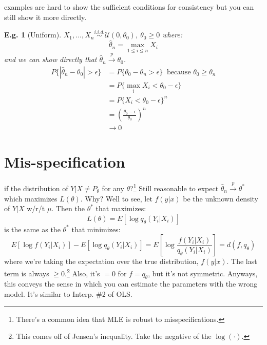\documentclass{tufte-book}
\theoremstyle{mytheoremstyle}
\theoremstyle{mylemstyle}
\theoremstyle{mydefstyle}
\newtheorem*{ex}{E.g.}
\begin{document}
 examples are hard to show the sufficient conditions for consistency but you can still show it more directly.
\begin{ex}[Uniform] \(X_1, \dots, X_n \overset{i.i.d.}{\sim} \mathcal{U}(0, \theta_0),\ \theta_0 \ge 0\) where:
	\[\hat{\theta}_n = \max_{1 \le i \le n} X_i\]
and we can show directly that \(\hat{\theta}_n \overset{p}{\rightarrow} \theta_0\).
	\begin{align*}
		P\{|\hat{\theta}_n - \theta_0| > \epsilon\} & = P\{\theta_0 - \theta_n > \epsilon \}\ \text{ because } \theta_0 \ge \theta_n \\
										& =P\{\max_i X_i < \theta_0 - \epsilon \} \\
										& =P\{X_i < \theta_0 - \epsilon\}^n \\
										& =\left(\frac{\theta_0 - \epsilon}{\theta_0}\right)^n \\
										& \rightarrow 0
	\end{align*}									
\end{ex}

\section{Mis-specification} 
 if the distribution of \(Y|X \ne P_\theta\) for any \(\theta\)?\footnote{There's a common idea that MLE is robust to misspecifications.} Still reasonable to expect \(\hat{\theta}_n \overset{p}{\rightarrow} \theta^*\) which maximizes \(L(\theta)\). Why? Well to see, let \(f(y|x)\) be the unknown density of \(Y|X\) w/r/t \(\mu\). Then the \(\theta^*\) that maximizes:
	\[L(\theta) = E[\log q_\theta(Y_i | X_i)] \]
is the same as the \(\theta^*\) that minimizes:
	\[E[\log f(Y_i | X_i)] - E[\log q_\theta (Y_i | X_i)] = E\left[\log \frac{f(Y_i | X_i)}{q_\theta(Y_i |X_i)}\right] = d(f,q_\theta)\]
where we're taking the expectation over the true distribution, \(f(y|x)\). The last term is always \(\ge 0\).\footnote{This comes off of Jensen's inequality. Take the negative of the \(\log(\cdot)\).} Also, it's \(= 0\) for \(f = q_\theta\), but it's not symmetric. Anyways, this conveys the sense in which you can estimate the parameters with the wrong model. It's similar to Interp. \#2 of OLS.
\end{document}
